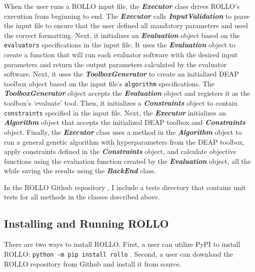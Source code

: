 When the user runs a \gls{ROLLO} input file, the \textbf{\textit{Executor}} class 
drives \gls{ROLLO}'s execution from beginning to end.
The \textbf{\textit{Executor}} calls \textbf{\textit{InputValidation}} to 
parse the input file to ensure that the user defined all mandatory parameters
and used the correct formatting.
Next, it initializes an \textbf{\textit{Evaluation}} object based on the 
\texttt{evaluators} specifications in the input file. 
It uses the \textbf{\textit{Evaluation}} object to create a function that will 
run each evaluator software with the desired input parameters and return the 
output parameters calculated by the evaluator software. 
Next, it uses the \textbf{\textit{ToolboxGenerator}} to create an initialized 
DEAP toolbox object based on the input file's \texttt{algorithm} specifications. 
The \textbf{\textit{ToolboxGenerator}} object accepts the 
\textbf{\textit{Evaluation}} object and registers it as the toolbox's `evaluate' 
tool.  
Then, it initializes a \textbf{\textit{Constraints}} object to contain 
\texttt{constraints} specified in the input file. 
Next, the \textbf{\textit{Executor}} initializes an \textbf{\textit{Algorithm}} 
object that accepts the initialized \gls{DEAP} toolbox and \textbf{\textit{Constraints}} 
object. 
Finally, the \textbf{\textit{Executor}} class uses a method in the 
\textbf{\textit{Algorithm}} object to run a general genetic algorithm with 
hyperparameters from the \gls{DEAP} toolbox, apply constraints defined in the 
\textbf{\textit{Constraints}} object, and calculate objective functions using 
the evaluation function created by the \textbf{\textit{Evaluation}} object, all 
the while saving the results using the \textbf{\textit{BackEnd}} class. 

In the \gls{ROLLO} Github repository \cite{chee_rollo_2021}, I include a tests 
directory that contains unit tests for all methods in the classes described 
above. 

\subsection{Installing and Running \gls{ROLLO}}
There are two ways to install \gls{ROLLO}.
First, a user can utilize \gls{PyPI} to install \gls{ROLLO}: \texttt{python -m 
pip install rollo}
\cite{chee_rollo_2021}.
Second, a user can download the \gls{ROLLO} repository \cite{chee_rollo_2021}
from Github and install it from source. 

